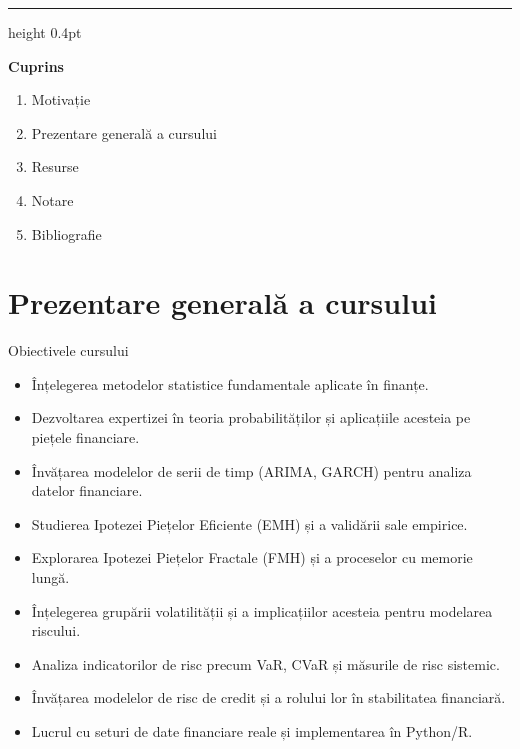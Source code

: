 \documentclass[9pt, aspectratio=169, t]{beamer}
\theoremstyle{definition}
\begin{document}
{
\begin{frame}{}
    {\color{FooterGray}\hrule height 0.4pt}

    \vspace{0.3cm}

    {\Large\textcolor{IDAred}{\textbf{Cuprins}}}

    \vspace{0.4cm}

    \begin{enumerate}
        \item Motivație \checkmark
        \item Prezentare generală a cursului
        \item Resurse
        \item Notare
        \item Bibliografie
    \end{enumerate}
\end{frame}
}

\section{Prezentare generală a cursului}

\begin{frame}{Obiectivele cursului}
\begin{itemize}
    \item Înțelegerea metodelor statistice fundamentale aplicate în finanțe.
    \item Dezvoltarea expertizei în teoria probabilităților și aplicațiile acesteia pe piețele financiare.
    \item Învățarea modelelor de serii de timp (ARIMA, GARCH) pentru analiza datelor financiare.
    \item Studierea Ipotezei Piețelor Eficiente (EMH) și a validării sale empirice.
    \item Explorarea Ipotezei Piețelor Fractale (FMH) și a proceselor cu memorie lungă.
    \item Înțelegerea grupării volatilității și a implicațiilor acesteia pentru modelarea riscului.
    \item Analiza indicatorilor de risc precum VaR, CVaR și măsurile de risc sistemic.
    \item Învățarea modelelor de risc de credit și a rolului lor în stabilitatea financiară.
    \item Lucrul cu seturi de date financiare reale și implementarea în Python/R.
\end{itemize}
\end{frame}
\end{document}
